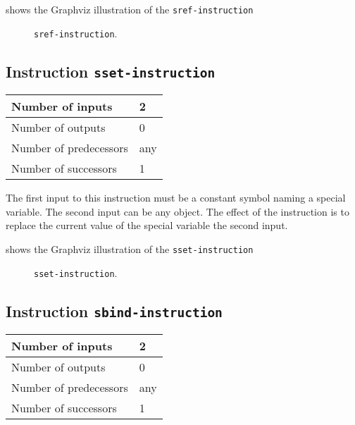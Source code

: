  shows the Graphviz illustration of the
\texttt{sref-instruction}

\begin{figure}
\begin{center}
\end{center}
\caption{\label{fig-sref-instruction}
\texttt{sref-instruction}.}
\end{figure}

\subsection{Instruction \texttt{sset-instruction}}
\label{mir-instruction-sset}

\begin{tabular}{|l|l|}
\hline
Number of inputs & 2\\
\hline
Number of outputs & 0\\
\hline
Number of predecessors & any\\
\hline
Number of successors & 1\\
\hline
\end{tabular}

The first input to this instruction must be a constant symbol naming a
special variable.  The second input can be any object.  The effect of
the instruction is to replace the current value of the special
variable the second input.

 shows the Graphviz illustration of the
\texttt{sset-instruction}

\begin{figure}
\begin{center}
\end{center}
\caption{\label{fig-sset-instruction}
\texttt{sset-instruction}.}
\end{figure}

\subsection{Instruction \texttt{sbind-instruction}}
\label{mir-instruction-sbind}

\begin{tabular}{|l|l|}
\hline
Number of inputs & 2\\
\hline
Number of outputs & 0\\
\hline
Number of predecessors & any\\
\hline
Number of successors & 1\\
\hline
\end{tabular}

